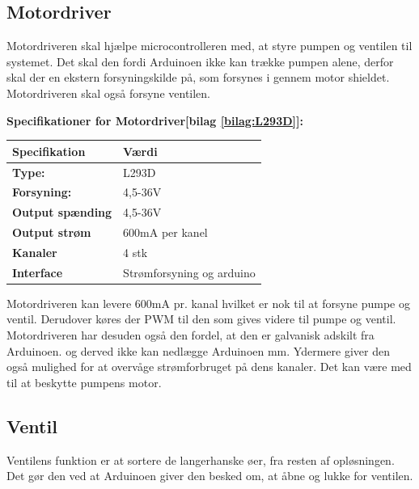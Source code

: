 \subsection{Motordriver}
Motordriveren skal hjælpe microcontrolleren med, at styre pumpen og ventilen til systemet. Det skal den fordi Arduinoen ikke kan trække pumpen alene, derfor skal der en ekstern forsyningskilde på, som forsynes i gennem motor shieldet. Motordriveren skal også forsyne ventilen. 

 \textbf{Specifikationer for Motordriver[bilag \ref{bilag:L293D}]:} 
\begin{center}
		\begin{longtable}{ | m{6.5cm} | m{6.5cm}| } 
			\hline
			\textbf{Specifikation} &\textbf{Værdi} \\ 
			\hline
			\textbf{Type:} & L293D \\ 
			\hline
			\textbf{Forsyning:} &  4,5-36V \\ 
			\hline
			\textbf{Output spænding} & 4,5-36V  \\ 
			\hline		
			\textbf{Output strøm} & 600mA per kanel  \\ 
			\hline	
			\textbf{Kanaler} & 4 stk  \\ 
			\hline	
			\textbf{Interface} & Strømforsyning og arduino  \\ 
			\hline	
		\end{longtable}
\end{center}
Motordriveren kan levere 600mA pr. kanal hvilket er nok til at forsyne pumpe og ventil. Derudover køres der PWM til den som gives videre til pumpe og ventil. Motordriveren har desuden også den fordel, at den er galvanisk adskilt fra Arduinoen. og derved ikke kan nedlægge Arduinoen mm. Ydermere giver den også mulighed for at overvåge strømforbruget på dens kanaler. Det kan være med til at beskytte pumpens motor.


\subsection{Ventil} \label{design_ventil}
Ventilens funktion er at sortere de langerhanske øer, fra resten af opløsningen. Det gør den ved at Arduinoen giver den besked om, at åbne og lukke for ventilen.

